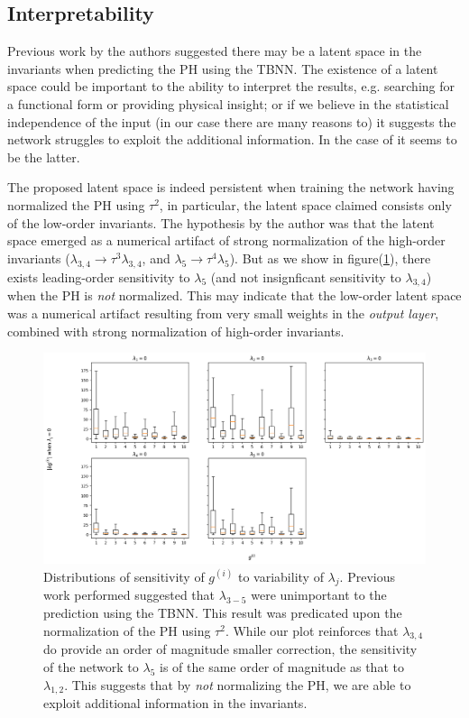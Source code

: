 \subsection{Interpretability}
Previous work by the authors \cite{hyett2022applicability} suggested there may be a latent space in the invariants when predicting the PH using the TBNN. The existence of a latent space could be important to the ability to interpret the results, e.g. searching for a functional form or providing physical insight; or if we believe in the statistical independence of the input (in our case there are many reasons to) it suggests the network struggles to exploit the additional information. In the case of \cite{hyett2022applicability} it seems to be the latter.

The proposed latent space is indeed persistent when training the network having normalized the PH using $\tau^2$, in particular, the latent space claimed consists only of the low-order invariants. The hypothesis by the author was that the latent space emerged as a numerical artifact of strong normalization of the high-order invariants ($\lambda_{3,4} \to \tau^3 \lambda_{3,4}$, and $\lambda_5 \to \tau^4 \lambda_5$). But as we show in figure(\ref{fig:dg}), there exists leading-order sensitivity to $\lambda_5$ (and not insignficant sensitivity to $\lambda_{3,4}$) when the PH is \textit{not} normalized. This may indicate that the low-order latent space was a numerical artifact resulting from very small weights in the \textit{output layer}, combined with strong normalization of high-order invariants.

\begin{figure}
    \centering
    \includegraphics[width=\textwidth]{LagrangianDeformationModels/figs/dg.png}
    \caption{Distributions of sensitivity of $g^{(i)}$ to variability of $\lambda_j$. Previous work performed suggested that $\lambda_{3-5}$ were unimportant to the prediction using the TBNN. This result was predicated upon the normalization of the PH using $\tau^2$. While our plot reinforces that $\lambda_{3,4}$ do provide an order of magnitude smaller correction, the sensitivity of the network to $\lambda_5$ is of the same order of magnitude as that to $\lambda_{1,2}$. This suggests that by \textit{not} normalizing the PH, we are able to exploit additional information in the invariants.}
    \label{fig:dg}
\end{figure}

